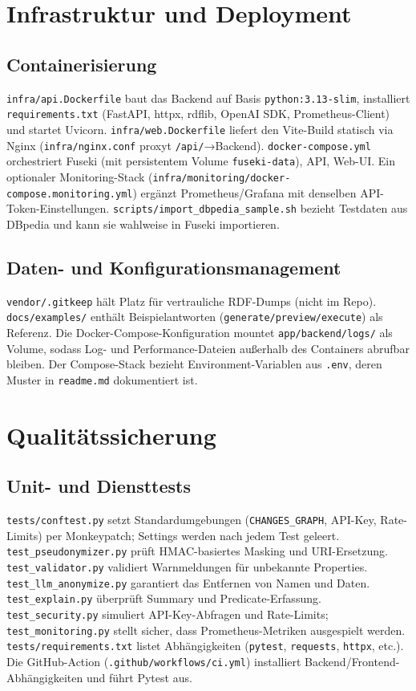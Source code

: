 \section{Infrastruktur und Deployment}

\subsection{Containerisierung}
\texttt{infra/api.Dockerfile} baut das Backend auf Basis \texttt{python:3.13-slim}, installiert \texttt{requirements.txt} (FastAPI, httpx, rdflib, OpenAI SDK, Prometheus-Client) und startet Uvicorn. \texttt{infra/web.Dockerfile} liefert den Vite-Build statisch via Nginx (\texttt{infra/nginx.conf} proxyt \texttt{/api/}→Backend). \texttt{docker-compose.yml} orchestriert Fuseki (mit persistentem Volume \texttt{fuseki-data}), API, Web-UI. Ein optionaler Monitoring-Stack (\texttt{infra/monitoring/docker-compose.monitoring.yml}) ergänzt Prometheus/Grafana mit denselben API-Token-Einstellungen. \texttt{scripts/import\_dbpedia\_sample.sh} bezieht Testdaten aus DBpedia und kann sie wahlweise in Fuseki importieren.

\subsection{Daten- und Konfigurationsmanagement}
\texttt{vendor/.gitkeep} hält Platz für vertrauliche RDF-Dumps (nicht im Repo). \texttt{docs/examples/} enthält Beispielantworten (\texttt{generate/preview/execute}) als Referenz. Die Docker-Compose-Konfiguration mountet \texttt{app/backend/logs/} als Volume, sodass Log- und Performance-Dateien außerhalb des Containers abrufbar bleiben. Der Compose-Stack bezieht Environment-Variablen aus \texttt{.env}, deren Muster in \texttt{readme.md} dokumentiert ist.

\section{Qualitätssicherung}

\subsection{Unit- und Diensttests}
\texttt{tests/conftest.py} setzt Standardumgebungen (\texttt{CHANGES\_GRAPH}, API-Key, Rate-Limits) per Monkeypatch; Settings werden nach jedem Test geleert. \texttt{test\_pseudonymizer.py} prüft HMAC-basiertes Masking und URI-Ersetzung. \texttt{test\_validator.py} validiert Warnmeldungen für unbekannte Properties. \texttt{test\_llm\_anonymize.py} garantiert das Entfernen von Namen und Daten. \texttt{test\_explain.py} überprüft Summary und Predicate-Erfassung. \texttt{test\_security.py} simuliert API-Key-Abfragen und Rate-Limits; \texttt{test\_monitoring.py} stellt sicher, dass Prometheus-Metriken ausgespielt werden. \texttt{tests/requirements.txt} listet Abhängigkeiten (\texttt{pytest}, \texttt{requests}, \texttt{httpx}, etc.). Die GitHub-Action (\texttt{.github/workflows/ci.yml}) installiert Backend/Frontend-Abhängigkeiten und führt Pytest aus.


